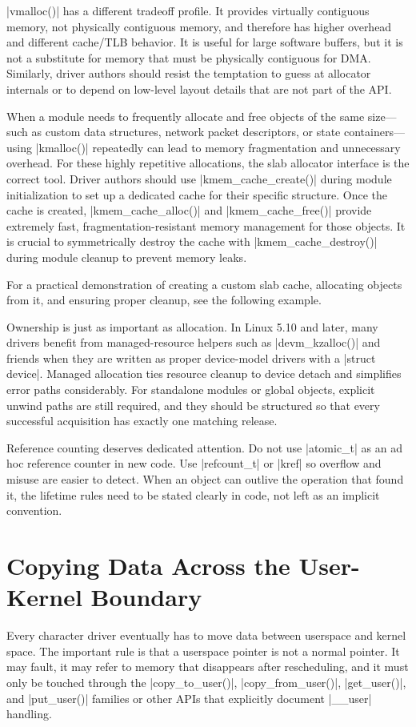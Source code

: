 \documentclass[10pt, oneside]{book}
\begin{document}
\cpp|vmalloc()| has a different tradeoff profile.
It provides virtually contiguous memory, not physically contiguous memory, and
therefore has higher overhead and different cache/TLB behavior.
It is useful for large software buffers, but it is not a substitute for memory
that must be physically contiguous for DMA.
Similarly, driver authors should resist the temptation to guess at allocator
internals or to depend on low-level layout details that are not part of the API.

When a module needs to frequently allocate and free objects of the same size---such 
as custom data structures, network packet descriptors, or state containers---using 
\cpp|kmalloc()| repeatedly can lead to memory fragmentation and unnecessary overhead.
For these highly repetitive allocations, the slab allocator interface is the 
correct tool. 
Driver authors should use \cpp|kmem_cache_create()| during module initialization 
to set up a dedicated cache for their specific structure. 
Once the cache is created, \cpp|kmem_cache_alloc()| and \cpp|kmem_cache_free()| 
provide extremely fast, fragmentation-resistant memory management for those objects.
It is crucial to symmetrically destroy the cache with \cpp|kmem_cache_destroy()| 
during module cleanup to prevent memory leaks.

For a practical demonstration of creating a custom slab cache, allocating objects from
it, and ensuring proper cleanup, see the following example.


Ownership is just as important as allocation.
In Linux 5.10 and later, many drivers benefit from managed-resource helpers such as
\cpp|devm_kzalloc()| and friends when they are written as proper device-model
drivers with a \cpp|struct device|.
Managed allocation ties resource cleanup to device detach and simplifies error
paths considerably.
For standalone modules or global objects, explicit unwind paths are still
required, and they should be structured so that every successful acquisition has
exactly one matching release.

Reference counting deserves dedicated attention.
Do not use \cpp|atomic_t| as an ad hoc reference counter in new code.
Use \cpp|refcount_t| or \cpp|kref| so overflow and misuse are easier to detect.
When an object can outlive the operation that found it, the lifetime rules need
to be stated clearly in code, not left as an implicit convention.

\section{Copying Data Across the User-Kernel Boundary}
\label{sec:user_kernel_boundary}
Every character driver eventually has to move data between userspace and kernel
space.
The important rule is that a userspace pointer is not a normal pointer.
It may fault, it may refer to memory that disappears after rescheduling, and it
must only be touched through the \cpp|copy_to_user()|, \cpp|copy_from_user()|,
\cpp|get_user()|, and \cpp|put_user()| families or other APIs that explicitly
document \cpp|__user| handling.
\end{document}
